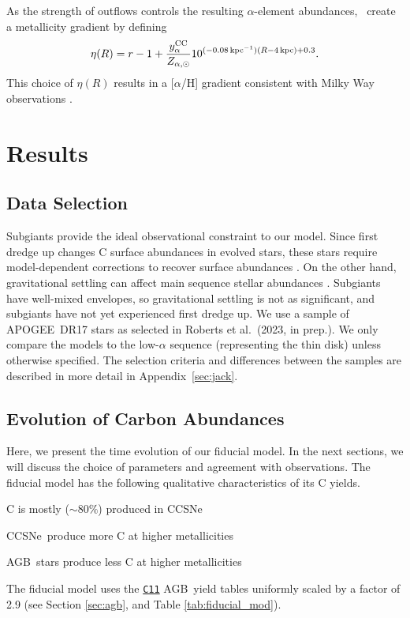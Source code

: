 \documentclass[fleqn,usenatbib]{mnras}
\newcommand{\JJ}{\citetalias{james+21}}
\newcommand{\citetjack}{Roberts et al.~(2023, in prep.)}
\newcommand{\cxi}{\texttt{\hyperlink{C11}{C11}}}
\newcommand{\agb}{AGB}
\newcommand{\apogee}{APOGEE}
\newcommand{\cc}{CCSNe}
\newcommand{\about}[1]{${\sim} #1$}
\begin{document}
As the strength of outflows controls the resulting $\alpha$-element abundances, \JJ~create a metallicity gradient by defining
\begin{equation}\label{eq:eta_r}
\eta(R) = r - 1 + \frac{y_{\alpha}^{\rm CC}}{Z_{\alpha, \odot}} 10^{(-0.08\,\text{kpc}^{-1})(R-4\,\text{kpc})+0.3}.
\end{equation}
This choice of $\eta(R)$ results in a [$\alpha$/H] gradient consistent with Milky Way observations \citep[e.g.][]{hayden+14, weinberg+19, frinchaboy+13}.


\section{Results}
\subsection{Data Selection}

Subgiants provide the ideal observational constraint to our model. Since first dredge up changes C surface abundances in evolved stars, these stars require model-dependent corrections to recover surface abundances \citep[e.g.][]{vincenzo+21}. On the other hand, gravitational settling can affect main sequence stellar abundances \citep[e.g.][]{souto19}. Subgiants have well-mixed envelopes, so gravitational settling is not as significant, and subgiants have not yet experienced first dredge up. We use a sample of \apogee\ DR17 stars \citep{apogee17} as selected in \citetjack. We only compare the models to the low-$\alpha$ sequence (representing the thin disk) unless otherwise specified.  The selection criteria and differences between the samples are described in more detail in Appendix~\ref{sec:jack}.




\subsection{Evolution of Carbon Abundances}

Here, we present the time evolution of our fiducial model. In the next sections, we will discuss the choice of parameters and agreement with observations. 
The fiducial model has the following qualitative characteristics of its C yields.
\begin{description}
    \item C is mostly (\about{80\%}) produced in \cc
    \item \cc\ produce more C at higher metallicities
    \item \agb\ stars produce less C at higher metallicities 
\end{description} 
The fiducial model uses the \cxi{} \agb\ yield tables uniformly scaled by a factor of 2.9 (see Section \ref{sec:agb}, and Table \ref{tab:fiducial_mod}). 
\end{document}
